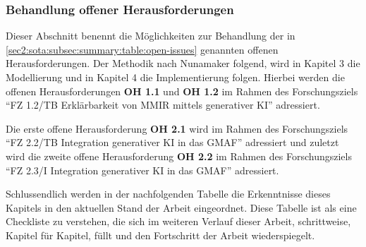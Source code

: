 \subsubsection{Behandlung offener Herausforderungen}
\label{sec2:sota:subsubsec:summary-handling-open-challenges}
Dieser Abschnitt benennt die Möglichkeiten zur Behandlung der in \cref{sec2:sota:subsec:summary:table:open-issues} genannten offenen Herausforderungen.
Der Methodik nach Nunamaker folgend, wird in Kapitel 3 die Modellierung und in Kapitel 4 die Implementierung folgen.
Hierbei werden die offenen Herausforderungen \textbf{OH 1.1} und \textbf{OH 1.2} im Rahmen des Forschungsziels \enquote{FZ 1.2/TB Erklärbarkeit von MMIR mittels generativer KI} adressiert.

Die erste offene Herausforderung \textbf{OH 2.1} wird im Rahmen des Forschungsziels \enquote{FZ 2.2/TB Integration generativer KI in das GMAF} adressiert und zuletzt wird die zweite offene Herausforderung \textbf{OH 2.2} im Rahmen des Forschungsziels \enquote{FZ 2.3/I Integration generativer KI in das GMAF} adressiert.

Schlussendlich werden in der nachfolgenden Tabelle die Erkenntnisse dieses Kapitels in den aktuellen Stand der Arbeit eingeordnet.
Diese Tabelle ist als eine Checkliste zu verstehen, die sich im weiteren Verlauf dieser Arbeit, schrittweise, Kapitel für Kapitel, füllt und den Fortschritt der Arbeit wiederspiegelt.

\clearpage



